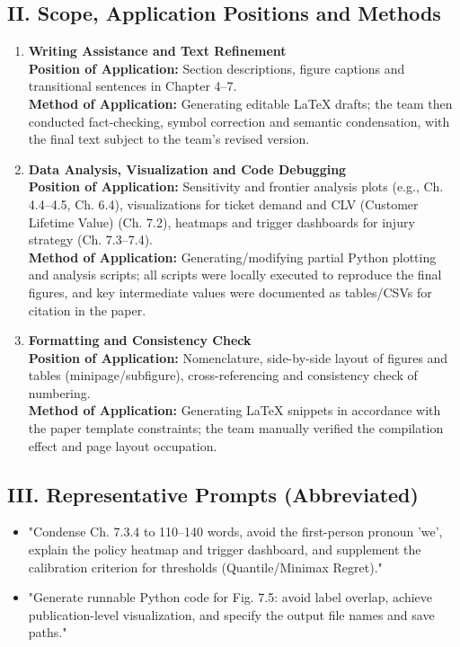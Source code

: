 \documentclass[12pt]{article}
\numberwithin{figure}{section}
\numberwithin{table}{section}
\begin{document}
	\subsection*{II. Scope, Application Positions and Methods}
	\begin{enumerate}
		\item \textbf{Writing Assistance and Text Refinement}\\
		\textbf{Position of Application:} Section descriptions, figure captions and transitional sentences in Chapter 4--7.\\
		\textbf{Method of Application:} Generating editable LaTeX drafts; the team then conducted fact-checking, symbol correction and semantic condensation, with the final text subject to the team's revised version.
		
		\item \textbf{Data Analysis, Visualization and Code Debugging}\\
		\textbf{Position of Application:} Sensitivity and frontier analysis plots (e.g., Ch. 4.4--4.5, Ch. 6.4), visualizations for ticket demand and CLV (Customer Lifetime Value) (Ch. 7.2), heatmaps and trigger dashboards for injury strategy (Ch. 7.3--7.4).\\
		\textbf{Method of Application:} Generating/modifying partial Python plotting and analysis scripts; all scripts were locally executed to reproduce the final figures, and key intermediate values were documented as tables/CSVs for citation in the paper.
		
		\item \textbf{Formatting and Consistency Check}\\
		\textbf{Position of Application:} Nomenclature, side-by-side layout of figures and tables (minipage/subfigure), cross-referencing and consistency check of numbering.\\
		\textbf{Method of Application:} Generating LaTeX snippets in accordance with the paper template constraints; the team manually verified the compilation effect and page layout occupation.
	\end{enumerate}
	
	\subsection*{III. Representative Prompts (Abbreviated)}
	\begin{itemize}
		\item "Condense Ch. 7.3.4 to 110--140 words, avoid the first-person pronoun 'we', explain the policy heatmap and trigger dashboard, and supplement the calibration criterion for thresholds (Quantile/Minimax Regret)."
		\item "Generate runnable Python code for Fig. 7.5: avoid label overlap, achieve publication-level visualization, and specify the output file names and save paths."
	\end{itemize}
	
\end{document}
